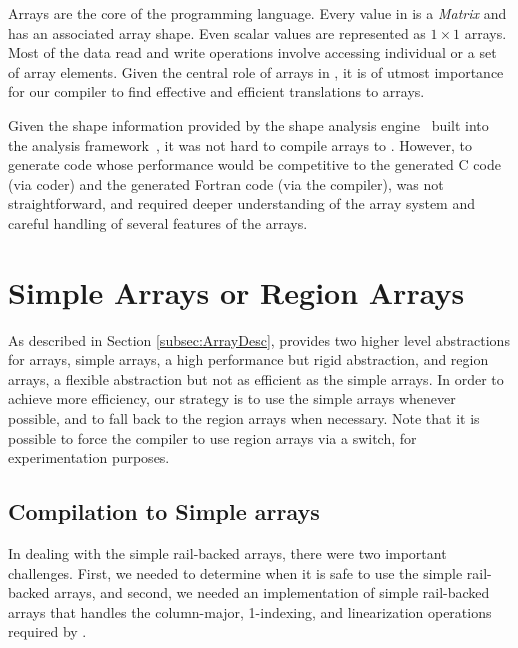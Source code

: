 \begin{comment}
-Key factors for efficient compilation of arrays
-how do we handle them
\end{comment}

Arrays are the core of the \matlab programming language. Every value in
\matlab is a \emph{Matrix} and has an associated array shape. Even
scalar values are represented as $1\times1$ arrays.  Most of the data
read and write operations involve accessing individual or a set of array
elements.  Given the central role of arrays in \matlab, it is of utmost
importance for our \mixten compiler to find effective and efficient
translations to \xten arrays. 

Given the shape information provided by the shape analysis engine~\cite{mc2for}
built into the \mclab analysis
framework~\cite{McSAFecoop12,JesseThesis,TamerPaper}, it was not hard to compile
\matlab arrays to \xten. However, to generate \xten code whose performance would
be competitive to the generated C code (via \matlab coder) and the generated
Fortran code (via the \mctwofor compiler), was not straightforward, and required
deeper understanding of the \xten array system and
careful handling of several features of the \matlab arrays.

\section{Simple Arrays or Region Arrays}

As described in Section \ref{subsec:ArrayDesc}, \xten provides two higher level
abstractions for arrays, simple arrays, a high performance but rigid
abstraction, and region arrays, a flexible abstraction but not as efficient as
the simple arrays. In order to achieve more efficiency, our strategy is to use
the simple arrays whenever possible, and to fall back to the region arrays when
necessary. Note that it is possible to force the \mixten compiler to use region
arrays via a switch, for experimentation purposes.

\subsection{Compilation to Simple arrays}\label{sec:compsimple}
In dealing with the simple
rail-backed arrays, there were two important challenges.  First, we needed to
determine when it is safe to use the simple rail-backed arrays,  and second, we
needed  an implementation of simple rail-backed arrays that handles the
column-major, 1-indexing, and linearization operations required by \matlab.
     
